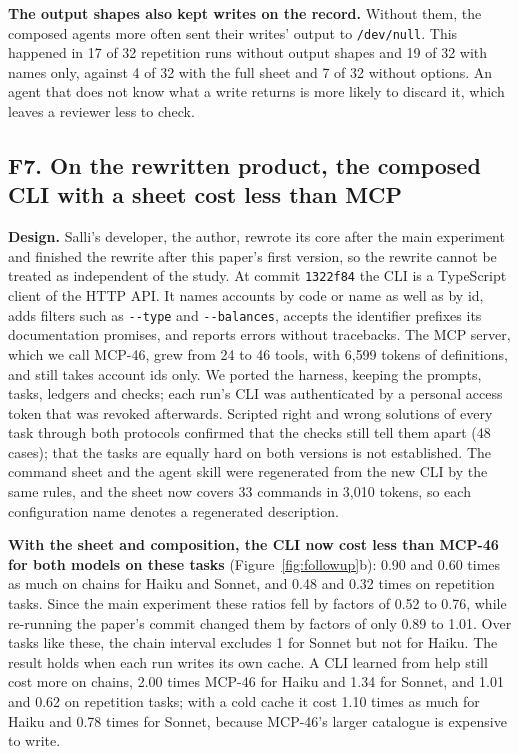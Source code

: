 \documentclass[sigconf,nonacm]{acmart}
\newcommand{\sysA}{Salli}
\newcommand{\flag}[1]{\texttt{-\/-#1}}
\newcommand{\cfg}[1]{\textsf{#1}}
\newcommand{\finding}[1]{\textbf{#1}}
\begin{document}
\finding{The output shapes also kept writes on the record.} Without them, the composed agents more often sent their writes' output to \texttt{/dev/null}. This happened in 17 of 32 repetition runs without output shapes and 19 of 32 with names only, against 4 of 32 with the full sheet and 7 of 32 without options. An agent that does not know what a write returns is more likely to discard it, which leaves a reviewer less to check.

\subsection{F7. On the rewritten product, the composed CLI with a sheet cost less than MCP}
\label{sec:f7}
\finding{Design.} \sysA{}'s developer, the author, rewrote its core after the main experiment and finished the rewrite after this paper's first version, so the rewrite cannot be treated as independent of the study. At commit \texttt{1322f84} the CLI is a TypeScript client of the HTTP API. It names accounts by code or name as well as by id, adds filters such as \flag{type} and \flag{balances}, accepts the identifier prefixes its documentation promises, and reports errors without tracebacks. The MCP server, which we call \cfg{MCP-46}, grew from 24 to 46 tools, with 6{,}599 tokens of definitions, and still takes account ids only. We ported the harness, keeping the prompts, tasks, ledgers and checks; each run's CLI was authenticated by a personal access token that was revoked afterwards. Scripted right and wrong solutions of every task through both protocols confirmed that the checks still tell them apart (48 cases); that the tasks are equally hard on both versions is not established. The command sheet and the agent skill were regenerated from the new CLI by the same rules, and the sheet now covers 33 commands in 3{,}010 tokens, so each configuration name denotes a regenerated description.

\finding{With the sheet and composition, the CLI now cost less than \cfg{MCP-46} for both models on these tasks} (Figure~\ref{fig:followup}b): 0.90 and 0.60 times as much on chains for Haiku and Sonnet, and 0.48 and 0.32 times on repetition tasks. Since the main experiment these ratios fell by factors of 0.52 to 0.76, while re-running the paper's commit changed them by factors of only 0.89 to 1.01. Over tasks like these, the chain interval excludes 1 for Sonnet but not for Haiku. The result holds when each run writes its own cache. A CLI learned from help still cost more on chains, 2.00 times \cfg{MCP-46} for Haiku and 1.34 for Sonnet, and 1.01 and 0.62 on repetition tasks; with a cold cache it cost 1.10 times as much for Haiku and 0.78 times for Sonnet, because \cfg{MCP-46}'s larger catalogue is expensive to write.
\end{document}
